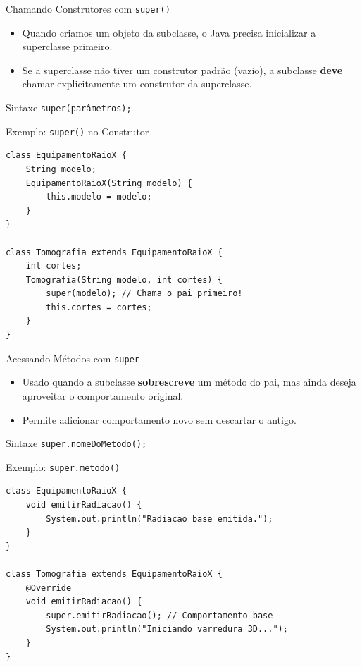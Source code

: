 \documentclass[9pt]{beamer}
\begin{document}
\begin{frame}{Chamando Construtores com \texttt{super()}}
    \begin{itemize}
        \item Quando criamos um objeto da subclasse, o Java precisa inicializar a superclasse primeiro.
        \item Se a superclasse não tiver um construtor padrão (vazio), a subclasse \textbf{deve} chamar explicitamente um construtor da superclasse.
    \end{itemize}
    \begin{block}{Sintaxe}
        \texttt{super(parâmetros);}
    \end{block}
\end{frame}

\begin{frame}[fragile]{Exemplo: \texttt{super()} no Construtor}
\begin{lstlisting}
class EquipamentoRaioX {
    String modelo;
    EquipamentoRaioX(String modelo) {
        this.modelo = modelo;
    }
}

class Tomografia extends EquipamentoRaioX {
    int cortes;
    Tomografia(String modelo, int cortes) {
        super(modelo); // Chama o pai primeiro!
        this.cortes = cortes;
    }
}
\end{lstlisting}
\end{frame}

\begin{frame}{Acessando Métodos com \texttt{super}}
    \begin{itemize}
        \item Usado quando a subclasse \textbf{sobrescreve} um método do pai, mas ainda deseja aproveitar o comportamento original.
        \item Permite adicionar comportamento novo sem descartar o antigo.
    \end{itemize}
    \begin{block}{Sintaxe}
        \texttt{super.nomeDoMetodo();}
    \end{block}
\end{frame}

\begin{frame}[fragile]{Exemplo: \texttt{super.metodo()}}
\begin{lstlisting}
class EquipamentoRaioX {
    void emitirRadiacao() {
        System.out.println("Radiacao base emitida.");
    }
}

class Tomografia extends EquipamentoRaioX {
    @Override
    void emitirRadiacao() {
        super.emitirRadiacao(); // Comportamento base
        System.out.println("Iniciando varredura 3D...");
    }
}
\end{lstlisting}
\end{frame}
\end{document}
